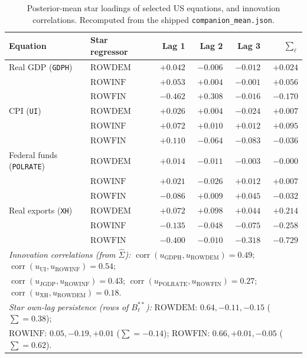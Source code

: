 \documentclass[11pt]{article}
\newcommand{\code}[1]{\texttt{\small #1}}
\begin{document}
\begin{table}[h]
\centering
\caption{Posterior-mean star loadings of selected US equations, and innovation correlations.
Recomputed from the shipped \code{companion\_mean.json}.}
\label{tab:loadings}
\small
\begin{tabular}{llrrrr}
\toprule
Equation & Star regressor & Lag 1 & Lag 2 & Lag 3 & $\sum_\ell$ \\
\midrule
Real GDP (\code{GDPH})      & $\mathrm{ROWDEM}$ & $+0.042$ & $-0.006$ & $-0.012$ & $+0.024$ \\
                            & $\mathrm{ROWINF}$ & $+0.053$ & $+0.004$ & $-0.001$ & $+0.056$ \\
                            & $\mathrm{ROWFIN}$ & $-0.462$ & $+0.308$ & $-0.016$ & $-0.170$ \\
\addlinespace
CPI (\code{UI})             & $\mathrm{ROWDEM}$ & $+0.026$ & $+0.004$ & $-0.024$ & $+0.007$ \\
                            & $\mathrm{ROWINF}$ & $+0.072$ & $+0.010$ & $+0.012$ & $+0.095$ \\
                            & $\mathrm{ROWFIN}$ & $+0.110$ & $-0.064$ & $-0.083$ & $-0.036$ \\
\addlinespace
Federal funds (\code{POLRATE}) & $\mathrm{ROWDEM}$ & $+0.014$ & $-0.011$ & $-0.003$ & $-0.000$ \\
                            & $\mathrm{ROWINF}$ & $+0.021$ & $-0.026$ & $+0.012$ & $+0.007$ \\
                            & $\mathrm{ROWFIN}$ & $-0.086$ & $+0.009$ & $+0.045$ & $-0.032$ \\
\addlinespace
Real exports (\code{XH})    & $\mathrm{ROWDEM}$ & $+0.072$ & $+0.098$ & $+0.044$ & $+0.214$ \\
                            & $\mathrm{ROWINF}$ & $-0.135$ & $-0.048$ & $-0.075$ & $-0.258$ \\
                            & $\mathrm{ROWFIN}$ & $-0.400$ & $-0.010$ & $-0.318$ & $-0.729$ \\
\midrule
\multicolumn{6}{l}{\emph{Innovation correlations (from $\hat\Sigma$):}\quad
  $\operatorname{corr}(u_{\mathrm{GDPH}}, u_{\mathrm{ROWDEM}}) = 0.49$;\quad
  $\operatorname{corr}(u_{\mathrm{UI}}, u_{\mathrm{ROWINF}}) = 0.54$;} \\
\multicolumn{6}{l}{\quad
  $\operatorname{corr}(u_{\mathrm{JGDP}}, u_{\mathrm{ROWINF}}) = 0.43$;\quad
  $\operatorname{corr}(u_{\mathrm{POLRATE}}, u_{\mathrm{ROWFIN}}) = 0.27$;\quad
  $\operatorname{corr}(u_{\mathrm{XH}}, u_{\mathrm{ROWDEM}}) = 0.18$.} \\
\midrule
\multicolumn{6}{l}{\emph{Star own-lag persistence (rows of $B^{**}_\ell$):}\quad
  $\mathrm{ROWDEM}$: $0.64, -0.11, -0.15$ ($\sum = 0.38$);} \\
\multicolumn{6}{l}{\quad
  $\mathrm{ROWINF}$: $0.05, -0.19, +0.01$ ($\sum = -0.14$);\quad
  $\mathrm{ROWFIN}$: $0.66, +0.01, -0.05$ ($\sum = 0.62$).} \\
\bottomrule
\end{tabular}
\end{table}
\end{document}
